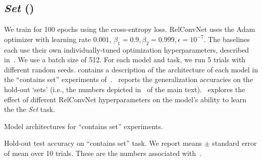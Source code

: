 \subsection{\textit{Set} ()}

We train for 100 epochs using the cross-entropy loss. RelConvNet uses the Adam optimizer with learning rate $0.001$, $\beta_1 = 0.9, \beta_2 = 0.999, \epsilon = 10^{-7}$. The baselines each use their own individually-tuned optimization hyperparameters, described in~. We use a batch size of 512. For each model and task, we run 5 trials with different random seeds. contains a description of the architecture of each model in the ``contains set'' experiments of~.~ reports the generalization accuracies on the hold-out `sets' (i.e., the numbers depicted in~ of the main text).~ explores the effect of different RelConvNet hyperparameters on the model's ability to learn the the \textit{Set} task.

\begin{table}[H]
    \centering
    
    \caption{Model architectures for ``contains set'' experiments.}\label{tab:set_architectures}
\end{table}

\begin{table}[H]
    \centering
    
    \caption{Hold-out test accuracy on ``contains set'' task. We report means $\pm$ standard error of mean over 10 trials. These are the numbers associated with~.}\label{tab:set_acc}
\end{table}

